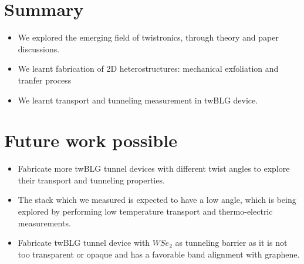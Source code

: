 \section{Summary}
\begin{itemize}
	\item We explored the emerging field of twistronics, through theory and paper discussions.
	\item We learnt fabrication of 2D heterostructures: mechanical exfoliation and tranfer process
	\item We learnt transport and tunneling measurement in twBLG device.
\end{itemize}

\section{Future work possible}
\begin{itemize}
	\item Fabricate more twBLG tunnel devices with different twist angles to explore their transport and tunneling properties.
	\item The stack which we measured is expected to have a low angle, which is being explored by performing low temperature transport and thermo-electric measurements.
	\item Fabricate twBLG tunnel device with $WSe_2$ as tunneling barrier as it is not too transparent or opaque and has a favorable band alignment with graphene.
\end{itemize}


